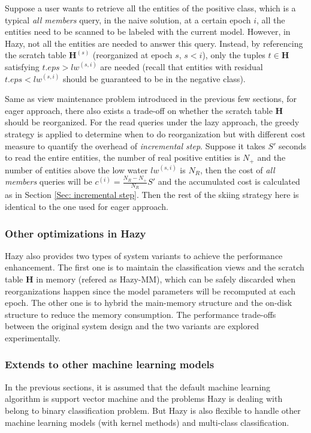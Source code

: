 Suppose a user wants to retrieve all the entities of the positive class, which is a typical {\em all members} query, in the naive solution, at a certain epoch $i$, all the entities need to be scanned to be labeled with the current model. However, in Hazy, not all the entities are needed to answer this query. Instead, by referencing the scratch table $\textbf{H}^{(s)}$ (reorganized at epoch $s$, $s < i$), only the tuples $t \in \textbf{H}$ satisfying $t.eps > lw^{(s,i)}$ are needed (recall that entities with residual $t.eps < lw^{(s,i)}$ should be guaranteed to be in the negative class). 

Same as view maintenance problem introduced in the previous few sections, for eager approach, there also exists a trade-off on whether the scratch table $\textbf{H}$ should be reorganized. For the read queries under the lazy approach, the greedy strategy is applied to determine when to do reorganization but with different cost measure to quantify the overhead of {\em incremental step}. Suppose it takes $S'$ seconds to read the entire entities, the number of real positive entities is $N_{+}$ and the number of entities above the low water $lw^{(s,i)}$ is $N_{R}$, then the cost of {\em all members} queries will be $c^{(i)} = \frac{N_{R}-N_{+}}{N_{R}}S'$ and the accumulated cost is calculated as in Section \ref{Sec: incremental step}. Then the rest of the skiing strategy here is identical to the one used for eager approach.


\subsubsection{Other optimizations in Hazy}
Hazy also provides two types of system variants to achieve the performance enhancement. The first one is to maintain the classification views and the scratch table $\textbf{H}$ in memory (refered as Hazy-MM), which can be safely discarded when reorganizations happen since the model parameters will be recomputed at each epoch. The other one is to hybrid the main-memory structure and the on-disk structure to reduce the memory consumption. The performance trade-offs between the original system design and the two variants are explored experimentally.

\subsubsection{Extends to other machine learning models}
In the previous sections, it is assumed that the default machine learning algorithm is support vector machine and the problems Hazy is dealing with belong to binary classification problem. But Hazy is also flexible to handle other machine learning models (with kernel methods) and multi-class classification.

